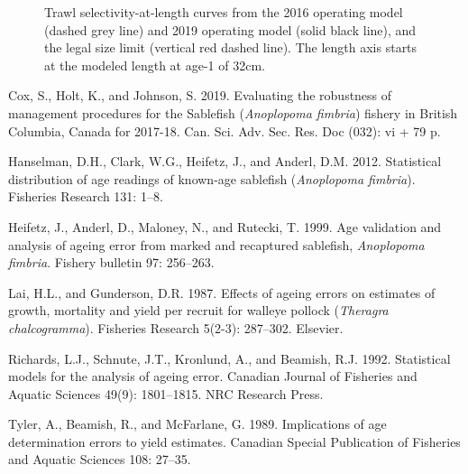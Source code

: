 \documentclass[11pt]{book}
\begin{document}
\newpage
\begin{figure}[htb]

{\centering {} 

}

\caption{Trawl selectivity-at-length curves from the 2016 operating model (dashed grey line) and 2019 operating model (solid black line), and the legal size limit (vertical red dashed line). The length axis starts at the modeled length at age-1 of 32cm.}\label{fig:unnamed-chunk-9}
\end{figure}
\hypertarget{refs}{}
\leavevmode\hypertarget{ref-cox2019evaluating}{}%
Cox, S., Holt, K., and Johnson, S. 2019. Evaluating the robustness of management procedures for the Sablefish (\emph{Anoplopoma fimbria}) fishery in British Columbia, Canada for 2017-18. Can. Sci. Adv. Sec. Res. Doc (032): vi + 79 p.

\leavevmode\hypertarget{ref-hanselman2012statistical}{}%
Hanselman, D.H., Clark, W.G., Heifetz, J., and Anderl, D.M. 2012. Statistical distribution of age readings of known-age sablefish (\emph{Anoplopoma fimbria}). Fisheries Research 131: 1--8.

\leavevmode\hypertarget{ref-heifetz1999age}{}%
Heifetz, J., Anderl, D., Maloney, N., and Rutecki, T. 1999. Age validation and analysis of ageing error from marked and recaptured sablefish, \emph{Anoplopoma fimbria}. Fishery bulletin 97: 256--263.

\leavevmode\hypertarget{ref-lai1987effects}{}%
Lai, H.L., and Gunderson, D.R. 1987. Effects of ageing errors on estimates of growth, mortality and yield per recruit for walleye pollock (\emph{Theragra chalcogramma}). Fisheries Research 5(2-3): 287--302. Elsevier.

\leavevmode\hypertarget{ref-richards1992statistical}{}%
Richards, L.J., Schnute, J.T., Kronlund, A., and Beamish, R.J. 1992. Statistical models for the analysis of ageing error. Canadian Journal of Fisheries and Aquatic Sciences 49(9): 1801--1815. NRC Research Press.

\leavevmode\hypertarget{ref-tyler1989implications}{}%
Tyler, A., Beamish, R., and McFarlane, G. 1989. Implications of age determination errors to yield estimates. Canadian Special Publication of Fisheries and Aquatic Sciences 108: 27--35.

\MakeAvailable
\end{document}
